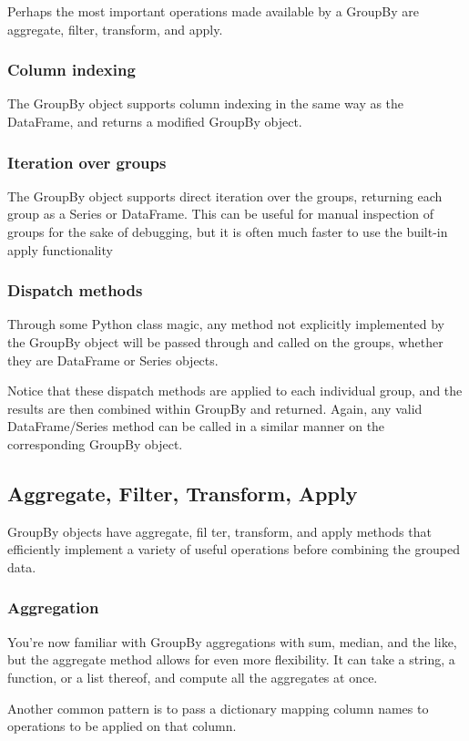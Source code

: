 Perhaps the most important operations made available by a GroupBy are aggregate,
filter, transform, and apply.
\subsubsection*{Column indexing}
The GroupBy object supports column indexing in the same way as the DataFrame, and returns a modified GroupBy object.

\subsubsection*{Iteration over groups}

The GroupBy object supports direct iteration over the groups, returning each group as
a Series or DataFrame. This can be useful for manual inspection of groups for the sake of debugging, but it is
often much faster to use the built-in apply functionality
\subsubsection*{Dispatch methods}
Through some Python class magic, any method not explicitly implemented by the
GroupBy object will be passed through and called on the groups, whether they are
DataFrame or Series objects.

Notice that these dispatch methods are applied to each individual group, and the
results are then combined within GroupBy and returned. Again, any valid DataFrame/Series method can be called in a similar manner on the corresponding GroupBy
object.
\subsection*{Aggregate, Filter, Transform, Apply}
GroupBy objects have aggregate, fil
ter, transform, and apply methods that efficiently implement a variety of useful
operations before combining the grouped data.
\subsubsection*{Aggregation}
You're now familiar with GroupBy aggregations with sum, median, and the like, but the
aggregate method allows for even more flexibility. It can take a string, a function, or
a list thereof, and compute all the aggregates at once.

Another common pattern is to pass a dictionary mapping column names to operations to be applied on that column.

